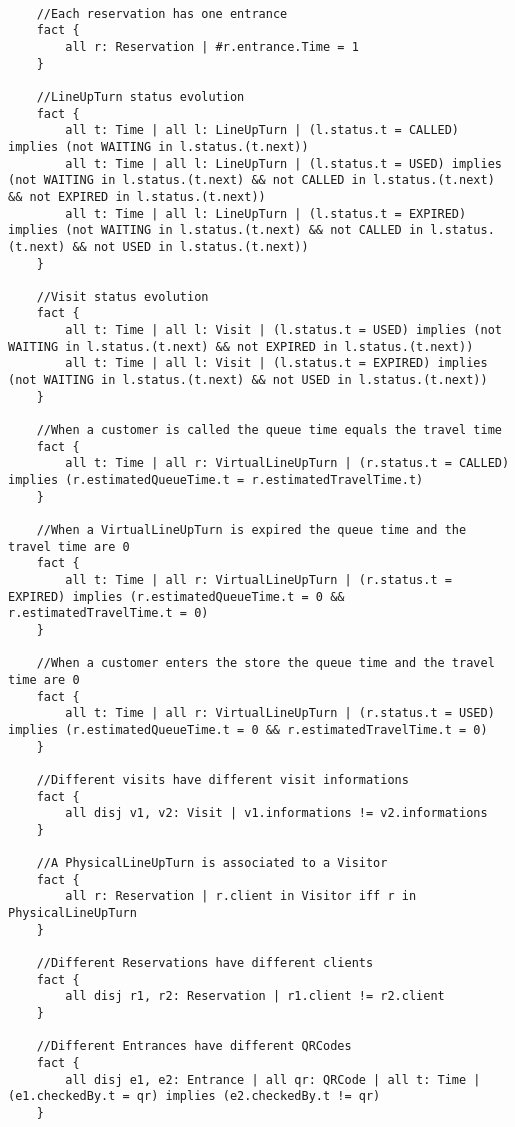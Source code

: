 \begin{lstlisting}[language=alloy]

    //Each reservation has one entrance
    fact {
        all r: Reservation | #r.entrance.Time = 1
    }

    //LineUpTurn status evolution
    fact {
        all t: Time | all l: LineUpTurn | (l.status.t = CALLED) implies (not WAITING in l.status.(t.next))
        all t: Time | all l: LineUpTurn | (l.status.t = USED) implies (not WAITING in l.status.(t.next) && not CALLED in l.status.(t.next) && not EXPIRED in l.status.(t.next))
        all t: Time | all l: LineUpTurn | (l.status.t = EXPIRED) implies (not WAITING in l.status.(t.next) && not CALLED in l.status.(t.next) && not USED in l.status.(t.next))
    }

    //Visit status evolution
    fact {
        all t: Time | all l: Visit | (l.status.t = USED) implies (not WAITING in l.status.(t.next) && not EXPIRED in l.status.(t.next))
        all t: Time | all l: Visit | (l.status.t = EXPIRED) implies (not WAITING in l.status.(t.next) && not USED in l.status.(t.next))
    }

    //When a customer is called the queue time equals the travel time
    fact {
        all t: Time | all r: VirtualLineUpTurn | (r.status.t = CALLED) implies (r.estimatedQueueTime.t = r.estimatedTravelTime.t)
    }

    //When a VirtualLineUpTurn is expired the queue time and the travel time are 0
    fact {
        all t: Time | all r: VirtualLineUpTurn | (r.status.t = EXPIRED) implies (r.estimatedQueueTime.t = 0 && r.estimatedTravelTime.t = 0)
    }

    //When a customer enters the store the queue time and the travel time are 0
    fact {
        all t: Time | all r: VirtualLineUpTurn | (r.status.t = USED) implies (r.estimatedQueueTime.t = 0 && r.estimatedTravelTime.t = 0)
    }

    //Different visits have different visit informations
    fact {
        all disj v1, v2: Visit | v1.informations != v2.informations
    }

    //A PhysicalLineUpTurn is associated to a Visitor
    fact {
        all r: Reservation | r.client in Visitor iff r in PhysicalLineUpTurn
    }

    //Different Reservations have different clients
    fact {
        all disj r1, r2: Reservation | r1.client != r2.client
    }

    //Different Entrances have different QRCodes
    fact {
        all disj e1, e2: Entrance | all qr: QRCode | all t: Time | (e1.checkedBy.t = qr) implies (e2.checkedBy.t != qr)
    }


\end{lstlisting}
